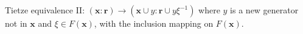 Tietze equivalence II: $(\mathbf{x} : \mathbf{r}) \to (\mathbf{x} \cup y : \mathbf{r} \cup y\xi^{-1})$ where $y$ is a new generator not in $\mathbf{x}$ and $\xi \in F(\mathbf{x})$, with the inclusion mapping on $F(\mathbf{x})$.

